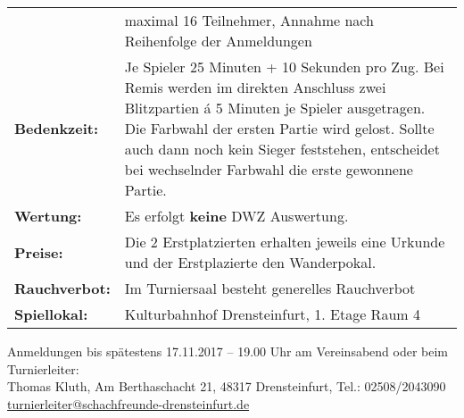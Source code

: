 \documentclass[a4paper,parskip=full-,DIV18]{scrartcl}
\begin{document}
\begin{tabular}{p{3 cm} p{13.5 cm}}
	\textbf{}              & maximal 16 Teilnehmer, Annahme nach Reihenfolge der Anmeldungen                                                                                                                                                                                                                                      \\
	\textbf{Bedenkzeit:}   & Je Spieler 25 Minuten + 10 Sekunden pro Zug. Bei Remis werden im direkten Anschluss zwei Blitzpartien á 5 Minuten je Spieler ausgetragen. Die Farbwahl der ersten Partie wird gelost. Sollte auch dann noch kein Sieger feststehen, entscheidet bei wechselnder Farbwahl die erste gewonnene Partie. \\
	\textbf{Wertung:}      & Es erfolgt \textbf{keine} DWZ Auswertung.                                                                                                                                                                                                                                                            \\
	\textbf{Preise:}       & Die 2 Erstplatzierten erhalten jeweils eine Urkunde und der Erstplazierte den Wanderpokal.                                                                                                                                                                                                           \\
	\textbf{Rauchverbot:}  & Im Turniersaal besteht generelles Rauchverbot                                                                                                                                                                                                                                                        \\
	\textbf{Spiellokal:}   & Kulturbahnhof Drensteinfurt, 1. Etage Raum 4
\end{tabular}


\bigskip

Anmeldungen bis spätestens 17.11.2017 – 19.00 Uhr am Vereinsabend oder beim Turnierleiter:\\
Thomas Kluth, Am Berthaschacht 21, 48317 Drensteinfurt, Tel.: 02508/2043090\\
\href{mailto:turnierleiter@schachfreunde-drensteinfurt.de}{turnierleiter@schachfreunde-drensteinfurt.de}
\end{document}
